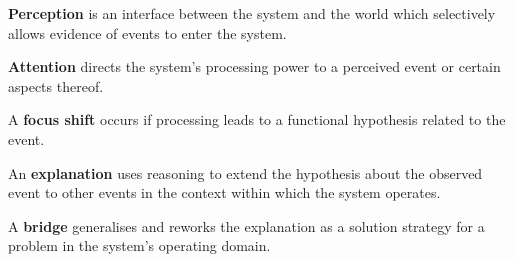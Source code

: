 

\begin{defn}%
\label{def:perception}
\hypertarget{def:perception}{}\textbf{Perception} is an interface
between the system and the world which selectively allows evidence of events to
enter the system.
\end{defn}


\begin{defn}\label{def:attention}
\hypertarget{def:attention}{}\textbf{Attention} directs the system's  processing power to a perceived event or certain aspects thereof.
\end{defn}

\begin{defn}\label{def:interest}
  \hypertarget{def:interest}{} A \textbf{focus shift} occurs if processing leads to a functional hypothesis related to the event.
\end{defn}

\begin{defn}\label{def:explanation}
  \hypertarget{def:explanation}{} An \textbf{explanation} uses
  reasoning to extend the hypothesis about the observed event to other
  events in the context within which the system operates.
\end{defn}

\begin{defn}\label{def:bridge}
\hypertarget{def:bridge}{}A \textbf{bridge} generalises and reworks
the explanation as a solution strategy for a problem in the system's
operating domain.
\end{defn}

